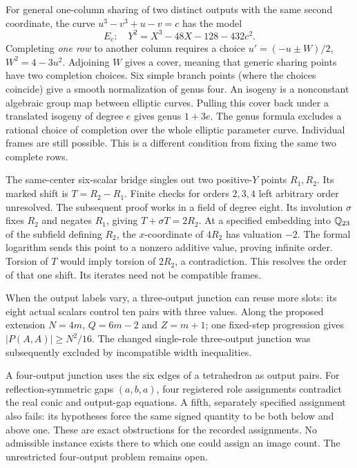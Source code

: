For general one-column sharing of two distinct outputs with the same second coordinate, the curve $u^3-v^3+u-v=c$ has the model
\[
 E_c:\quad Y^2=X^3-48X-128-432c^2.
\]
Completing \emph{one row} to another column requires a choice $u'=(-u\pm W)/2$, $W^2=4-3u^2$. Adjoining $W$ gives a cover, meaning that generic sharing points have two completion choices. Six simple branch points (where the choices coincide) give a smooth normalization of genus four. An isogeny is a nonconstant algebraic group map between elliptic curves. Pulling this cover back under a translated isogeny of degree $e$ gives genus $1+3e$. The genus formula excludes a rational choice of completion over the whole elliptic parameter curve. Individual frames are still possible. This is a different condition from fixing the same two complete rows. 

The same-center six-scalar bridge singles out two positive-$Y$ points $R_1,R_2$. Its marked shift is $T=R_2-R_1$. Finite checks for orders $2,3,4$ left arbitrary order unresolved. The subsequent proof works in a field of degree eight. Its involution $\sigma$ fixes $R_2$ and negates $R_1$, giving $T+\sigma T=2R_2$. At a specified embedding into $\mathbb Q_{23}$ of the subfield defining $R_2$, the $x$-coordinate of $4R_2$ has valuation $-2$. The formal logarithm sends this point to a nonzero additive value, proving infinite order. Torsion of $T$ would imply torsion of $2R_2$, a contradiction. This resolves the order of that one shift. Its iterates need not be compatible frames. 

When the output labels vary, a three-output junction can reuse more slots: its eight actual scalars control ten pairs with three values. Along the proposed extension $N=4m$, $Q=6m-2$ and $Z=m+1$; one fixed-step progression gives $|P(A,A)|\ge N^2/16$. The changed single-role three-output junction was subsequently excluded by incompatible width inequalities. 

A four-output junction uses the six edges of a tetrahedron as output pairs. For reflection-symmetric gaps $(a,b,a)$, four registered role assignments contradict the real conic and output-gap equations. A fifth, separately specified assignment also fails: its hypotheses force the same signed quantity to be both below and above one. These are exact obstructions for the recorded assignments. No admissible instance exists there to which one could assign an image count. The unrestricted four-output problem remains open. 

